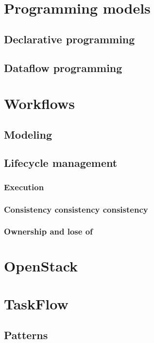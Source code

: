 \documentclass[11pt,a4paper]{article}
\begin{document}
\section{Programming models}

\subsection{Declarative programming}

\subsection{Dataflow programming}

\section{Workflows}

\subsection{Modeling}

\subsection{Lifecycle management}

\subsubsection{Execution}

\subsubsection{Consistency consistency consistency}

\subsubsection{Ownership and lose of}

\section{OpenStack}

\section{TaskFlow}

\subsection{Patterns}
\end{document}
